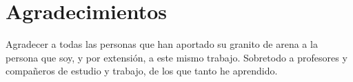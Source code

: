 
\chapter*{Agradecimientos}

Agradecer a todas las personas que han aportado su granito de arena a la persona que soy, y por extensión, a este mismo trabajo. Sobretodo a profesores y compañeros de estudio y trabajo, de los que tanto he aprendido.











